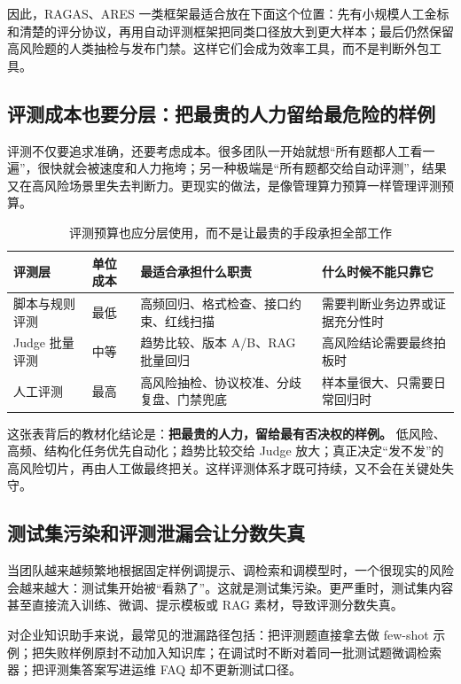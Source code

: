 因此，RAGAS、ARES 一类框架最适合放在下面这个位置：先有小规模人工金标和清楚的评分协议，再用自动评测框架把同类口径放大到更大样本；最后仍然保留高风险题的人类抽检与发布门禁。这样它们会成为效率工具，而不是判断外包工具。

\subsection{评测成本也要分层：把最贵的人力留给最危险的样例}
评测不仅要追求准确，还要考虑成本。很多团队一开始就想“所有题都人工看一遍”，很快就会被速度和人力拖垮；另一种极端是“所有题都交给自动评测”，结果又在高风险场景里失去判断力。更现实的做法，是像管理算力预算一样管理评测预算。

\begin{table}[H]
\centering
\small
\begin{tabularx}{\textwidth}{>{\raggedright\arraybackslash}p{2.7cm}>{\raggedright\arraybackslash}p{2.8cm}>{\raggedright\arraybackslash}p{2.8cm}>{\raggedright\arraybackslash}X}
\toprule
\textbf{评测层} & \textbf{单位成本} & \textbf{最适合承担什么职责} & \textbf{什么时候不能只靠它} \\
\midrule
脚本与规则评测 & 最低 & 高频回归、格式检查、接口约束、红线扫描 & 需要判断业务边界或证据充分性时 \\
Judge 批量评测 & 中等 & 趋势比较、版本 A/B、RAG 批量回归 & 高风险结论需要最终拍板时 \\
人工评测 & 最高 & 高风险抽检、协议校准、分歧复盘、门禁兜底 & 样本量很大、只需要日常回归时 \\
\bottomrule
\end{tabularx}
\caption{评测预算也应分层使用，而不是让最贵的手段承担全部工作}
\label{tab:eval-cost-layers}
\end{table}

这张表背后的教材化结论是：\textbf{把最贵的人力，留给最有否决权的样例。} 低风险、高频、结构化任务优先自动化；趋势比较交给 Judge 放大；真正决定“发不发”的高风险切片，再由人工做最终把关。这样评测体系才既可持续，又不会在关键处失守。

\subsection{测试集污染和评测泄漏会让分数失真}
当团队越来越频繁地根据固定样例调提示、调检索和调模型时，一个很现实的风险会越来越大：测试集开始被“看熟了”。这就是测试集污染。更严重时，测试集内容甚至直接流入训练、微调、提示模板或 RAG 素材，导致评测分数失真。

对企业知识助手来说，最常见的泄漏路径包括：把评测题直接拿去做 few-shot 示例；把失败样例原封不动加入知识库；在调试时不断对着同一批测试题微调检索器；把评测集答案写进运维 FAQ 却不更新测试口径。

